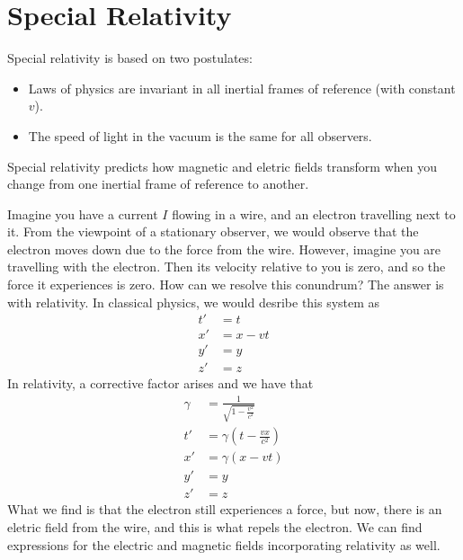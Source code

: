 \documentclass[nobib]{tufte-handout}
\begin{document}
\section{Special Relativity}
Special relativity is based on two
postulates:
\begin{itemize}
    \item Laws of physics are invariant in all
    inertial frames of reference (with constant $v$).
    \item The speed of light in the vacuum is the same
    for all observers.
\end{itemize}

Special relativity predicts how magnetic and eletric 
fields transform when you change from one inertial frame of 
reference to another.

Imagine you have a current $I$ flowing in a wire, and an electron 
travelling next to it. From the viewpoint of a stationary observer, 
we would observe that the electron moves down due to the force from 
the wire. However, imagine you are travelling with the electron. Then 
its velocity relative to you is zero, and so the force it experiences is 
zero. How can we resolve this conundrum? The answer is with relativity. 
In classical physics, we would desribe this system as 
\begin{align*}
    t' &= t \\
    x' &= x - vt \\
    y' &= y \\
    z' &= z
\end{align*}
In relativity, a corrective factor arises and we have that
\begin{align*}
    \gamma &= \frac{1}{\sqrt{1 - \frac{v^2}{c^2}}} \\
    t' &= \gamma \left(t - \frac{vx}{c^2}\right) \\
    x' &= \gamma (x - vt) \\
    y' &= y \\
    z' &= z
\end{align*}
What we find is that the electron still experiences a force, 
but now, there is an eletric field from the wire, and this is 
what repels the electron. We can find expressions for the electric 
and magnetic fields incorporating relativity as well. 
\end{document}
